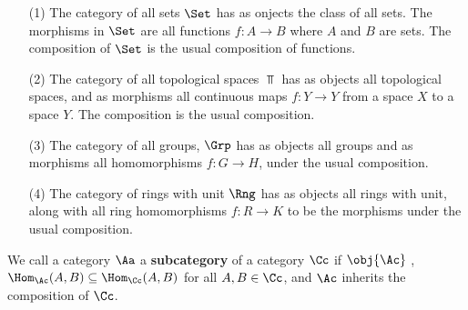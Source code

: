 \begin{example}\label{1.1}
    \begin{enumerate}
        \item[(1)] The category of all sets $\Set$ has as onjects the class of
            all sets. The morphisms in  $\Set$ are all functions  $f:A
            \xrightarrow{} B$ where $A$ and  $B$ are sets. The composition of
            $\Set$ is the usual composition of functions.

        \item[(2)] The category of all topological spaces $\Top$ has as objects
            all topological spaces, and as morphisms all continuous maps  $f:Y
            \xrightarrow{} Y$ from a space $X$ to a space  $Y$. The composition
            is the usual composition.

        \item[(3)] The category of all groups, $\Grp$ has as objects all groups
            and as morphisms all homomorphisms $f:G \xrightarrow{} H$, under the
            usual composition.

        \item[(4)] The category of rings with unit $\Rng$ has as objects all
            rings with unit, along with all ring homomorphisms  $f:R
            \xrightarrow{} K$ to be the morphisms under the usual composition.
    \end{enumerate}
\end{example}

\begin{definition}
    We call a category $\Aa$ a  \textbf{subcategory} of a category $\Cc$ if
    $\obj{\Ac}$ \subseteq \obj{\Cc}, $\Hom_{\Ac}{(A,B)} \subseteq
    \Hom_{\Cc}{(A,B)}$ for all $A,B \in \Cc$, and  $\Ac$ inherits the
    composition of  $\Cc$.
\end{definition}

